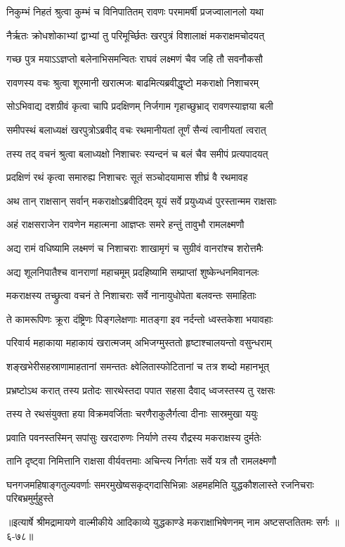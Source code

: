 
\twolineshloka
{निकुम्भं निहतं श्रुत्वा कुम्भं च विनिपातितम्}
{रावणः परमामर्षी प्रजज्वालानलो यथा} %

\twolineshloka
{नैर्ऋतः क्रोधशोकाभ्यां द्वाभ्यां तु परिमूर्च्छितः}
{खरपुत्रं विशालाक्षं मकराक्षमचोदयत्} %

\twolineshloka
{गच्छ पुत्र मयाऽऽज्ञप्तो बलेनाभिसमन्वितः}
{राघवं लक्ष्मणं चैव जहि तौ सवनौकसौ} %

\twolineshloka
{रावणस्य वचः श्रुत्वा शूरमानी खरात्मजः}
{बाढमित्यब्रवीद्धृष्टो मकराक्षो निशाचरम्} %

\twolineshloka
{सोऽभिवाद्य दशग्रीवं कृत्वा चापि प्रदक्षिणम्}
{निर्जगाम गृहाच्छुभ्राद् रावणस्याज्ञया बली} %

\twolineshloka
{समीपस्थं बलाध्यक्षं खरपुत्रोऽब्रवीद् वचः}
{रथमानीयतां तूर्णं सैन्यं त्वानीयतां त्वरात्} %

\twolineshloka
{तस्य तद् वचनं श्रुत्वा बलाध्यक्षो निशाचरः}
{स्यन्दनं च बलं चैव समीपं प्रत्यपादयत्} %

\twolineshloka
{प्रदक्षिणं रथं कृत्वा समारुह्य निशाचरः}
{सूतं सञ्चोदयामास शीघ्रं वै रथमावह} %

\twolineshloka
{अथ तान् राक्षसान् सर्वान् मकराक्षोऽब्रवीदिदम्}
{यूयं सर्वे प्रयुध्यध्वं पुरस्तान्मम राक्षसाः} %

\twolineshloka
{अहं राक्षसराजेन रावणेन महात्मना}
{आज्ञप्तः समरे हन्तुं तावुभौ रामलक्ष्मणौ} %

\twolineshloka
{अद्य रामं वधिष्यामि लक्ष्मणं च निशाचराः}
{शाखामृगं च सुग्रीवं वानरांश्च शरोत्तमैः} %

\twolineshloka
{अद्य शूलनिपातैश्च वानराणां महाचमूम्}
{प्रदहिष्यामि सम्प्राप्तां शुष्केन्धनमिवानलः} %

\twolineshloka
{मकराक्षस्य तच्छ्रुत्वा वचनं ते निशाचराः}
{सर्वे नानायुधोपेता बलवन्तः समाहिताः} %

\twolineshloka
{ते कामरूपिणः क्रूरा दंष्ट्रिणः पिङ्गलेक्षणाः}
{मातङ्गा इव नर्दन्तो ध्वस्तकेशा भयावहाः} %

\twolineshloka
{परिवार्य महाकाया महाकायं खरात्मजम्}
{अभिजग्मुस्ततो हृष्टाश्चालयन्तो वसुन्धराम्} %

\twolineshloka
{शङ्खभेरीसहस्राणामाहतानां समन्ततः}
{क्ष्वेलितास्फोटितानां च तत्र शब्दो महानभूत्} %

\twolineshloka
{प्रभ्रष्टोऽथ करात् तस्य प्रतोदः सारथेस्तदा}
{पपात सहसा दैवाद् ध्वजस्तस्य तु रक्षसः} %

\twolineshloka
{तस्य ते रथसंयुक्ता हया विक्रमवर्जिताः}
{चरणैराकुलैर्गत्वा दीनाः सास्रमुखा ययुः} %

\twolineshloka
{प्रवाति पवनस्तस्मिन् सपांसुः खरदारुणः}
{निर्याणे तस्य रौद्रस्य मकराक्षस्य दुर्मतेः} %

\twolineshloka
{तानि दृष्ट्वा निमित्तानि राक्षसा वीर्यवत्तमाः}
{अचिन्त्य निर्गताः सर्वे यत्र तौ रामलक्ष्मणौ} %

\twolineshloka
{घनगजमहिषाङ्गतुल्यवर्णाः समरमुखेष्वसकृद्गदासिभिन्नाः}
{अहमहमिति युद्धकौशलास्ते रजनिचराः परिबभ्रमुर्मुहुस्ते} %


॥इत्यार्षे श्रीमद्रामायणे वाल्मीकीये आदिकाव्ये युद्धकाण्डे मकराक्षाभिषेणनम् नाम अष्टसप्ततितमः सर्गः ॥६-७८॥
